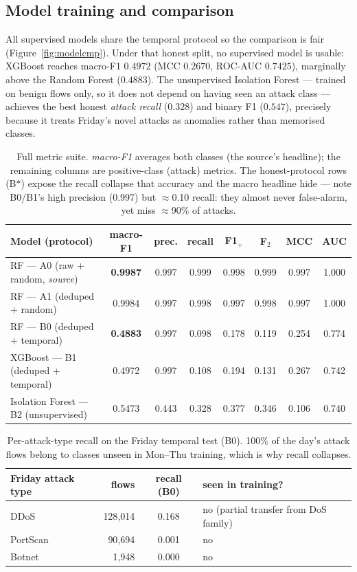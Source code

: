 \documentclass[11pt,a4paper]{article}
\begin{document}
\subsection{Model training and comparison}
All supervised models share the temporal protocol so the comparison is fair
(Figure~\ref{fig:modelcmp}). Under that honest split, no supervised model is usable:
XGBoost reaches macro-F1 $0.4972$ (MCC $0.2670$, ROC-AUC $0.7425$), marginally above the
Random Forest ($0.4883$). The unsupervised Isolation Forest --- trained on benign flows only,
so it does not depend on having seen an attack class --- achieves the best honest
\emph{attack recall} ($0.328$) and binary F1 ($0.547$), precisely because it treats Friday's
novel attacks as anomalies rather than memorised classes.

\begin{table}[H]
\centering\footnotesize
\setlength{\tabcolsep}{3.4pt}
\begin{tabular}{l c c c c c c c}
\toprule
\textbf{Model (protocol)} & \textbf{macro-F1} & \textbf{prec.} & \textbf{recall} & \textbf{F1$_+$} & \textbf{F$_2$} & \textbf{MCC} & \textbf{AUC}\\
\midrule
RF --- A0 (raw + random, \emph{source}) & \textbf{0.9987} & 0.997 & 0.999 & 0.998 & 0.999 & 0.997 & 1.000\\
RF --- A1 (deduped + random) & 0.9984 & 0.997 & 0.998 & 0.997 & 0.998 & 0.997 & 1.000\\
\midrule
RF --- B0 (deduped + temporal) & \textbf{0.4883} & 0.997 & 0.098 & 0.178 & 0.119 & 0.254 & 0.774\\
XGBoost --- B1 (deduped + temporal) & 0.4972 & 0.997 & 0.108 & 0.194 & 0.131 & 0.267 & 0.742\\
Isolation Forest --- B2 (unsupervised) & 0.5473 & 0.443 & 0.328 & 0.377 & 0.346 & 0.106 & 0.740\\
\bottomrule
\end{tabular}
\caption{Full metric suite. \emph{macro-F1} averages both classes (the source's headline); the
remaining columns are positive-class (attack) metrics. The honest-protocol rows (B$\ast$) expose
the recall collapse that accuracy and the macro headline hide --- note B0/B1's high precision
(0.997) but $\approx$0.10 recall: they almost never false-alarm, yet miss $\approx$90\% of attacks.}
\end{table}

\begin{table}[H]
\centering\small
\begin{tabular}{l r c l}
\toprule
\textbf{Friday attack type} & \textbf{flows} & \textbf{recall (B0)} & \textbf{seen in training?}\\
\midrule
DDoS & 128{,}014 & 0.168 & no (partial transfer from DoS family)\\
PortScan & 90{,}694 & 0.001 & no\\
Botnet & 1{,}948 & 0.000 & no\\
\bottomrule
\end{tabular}
\caption{Per-attack-type recall on the Friday temporal test (B0). 100\% of the day's attack
flows belong to classes unseen in Mon--Thu training, which is why recall collapses.}
\end{table}
\end{document}
